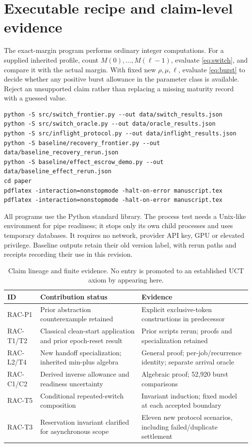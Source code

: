 \section{Executable recipe and claim-level evidence}
The exact-margin program performs ordinary integer computations. For a supplied inherited profile, count $M(0),\ldots,M(\ell-1)$, evaluate \cref{eq:switch}, and compare it with the actual margin. With fixed new $\rho,\mu,\ell$, evaluate \cref{eq:burst} to decide whether any positive burst allowance in the parameter class is available. Reject an unsupported claim rather than replacing a missing maturity record with a guessed value.
\begin{lstlisting}
python -S src/switch_frontier.py --out data/switch_results.json
python -S src/switch_oracle.py --out data/oracle_results.json
python -S src/inflight_protocol.py --out data/inflight_results.json
python -S baseline/recovery_frontier.py --out data/baseline_recovery_rerun.json
python -S baseline/effect_escrow_demo.py --out data/baseline_effect_rerun.json
cd paper
pdflatex -interaction=nonstopmode -halt-on-error manuscript.tex
pdflatex -interaction=nonstopmode -halt-on-error manuscript.tex
\end{lstlisting}
All programs use the Python standard library. The process test needs a Unix-like environment for pipe readiness; it stops only its own child processes and uses temporary databases. It requires no network, provider API key, GPU or elevated privilege. Baseline outputs retain their old version label, with rerun paths and receipts recording their use in this revision.

\begin{table}[ht]
\centering\small
\caption{Claim lineage and finite evidence. No entry is promoted to an established UCT axiom by appearing here.}
\begin{tabularx}{\linewidth}{@{}lXX@{}}\toprule
ID & Contribution status & Evidence\\ \midrule
RAC-P1 & Prior abstraction counterexample retained & Explicit exclusive-token constructions in predecessor\\
RAC-T1/T2 & Classical clean-start application and prior epoch-reset result & Prior scripts rerun; proofs and specialization retained\\
RAC-L2/T4 & New handoff specialization; inherited min-plus algebra & General proof; per-job/recurrence identity; separate arrival oracle\\
RAC-C1/C2 & Derived inverse allowance and readiness uncertainty & Algebraic proof; 52,920 burst comparisons\\
RAC-T5 & Conditional repeated-switch composition & Invariant induction; fixed model at each accepted boundary\\
RAC-T3 & Reservation invariant clarified for asynchronous scope & Eleven new protocol scenarios, including failed/duplicate settlement\\ \bottomrule
\end{tabularx}
\end{table}

